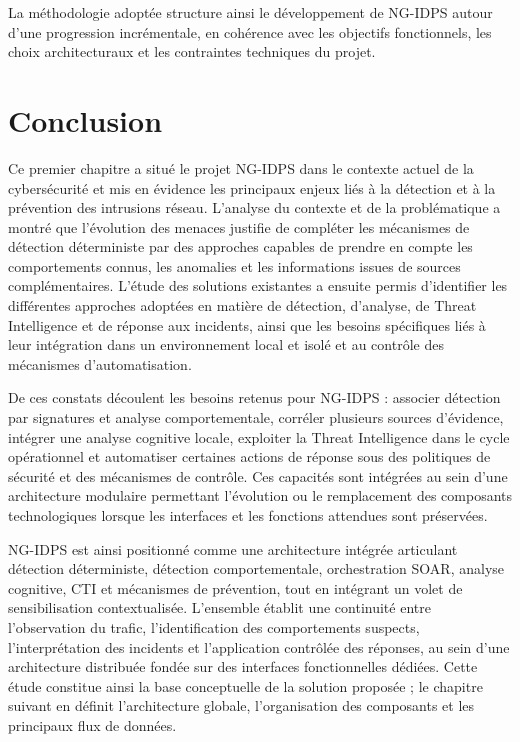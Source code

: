 La méthodologie adoptée structure ainsi le développement de NG-IDPS autour d'une progression incrémentale, en cohérence avec les objectifs fonctionnels, les choix architecturaux et les contraintes techniques du projet.

\section{Conclusion}

Ce premier chapitre a situé le projet NG-IDPS dans le contexte actuel de la cybersécurité et mis en évidence les principaux enjeux liés à la détection et à la prévention des intrusions réseau. L'analyse du contexte et de la problématique a montré que l'évolution des menaces justifie de compléter les mécanismes de détection déterministe par des approches capables de prendre en compte les comportements connus, les anomalies et les informations issues de sources complémentaires. L'étude des solutions existantes a ensuite permis d'identifier les différentes approches adoptées en matière de détection, d'analyse, de Threat Intelligence et de réponse aux incidents, ainsi que les besoins spécifiques liés à leur intégration dans un environnement local et isolé et au contrôle des mécanismes d'automatisation.

De ces constats découlent les besoins retenus pour NG-IDPS : associer détection par signatures et analyse comportementale, corréler plusieurs sources d'évidence, intégrer une analyse cognitive locale, exploiter la Threat Intelligence dans le cycle opérationnel et automatiser certaines actions de réponse sous des politiques de sécurité et des mécanismes de contrôle. Ces capacités sont intégrées au sein d'une architecture modulaire permettant l'évolution ou le remplacement des composants technologiques lorsque les interfaces et les fonctions attendues sont préservées.

NG-IDPS est ainsi positionné comme une architecture intégrée articulant détection déterministe, détection comportementale, orchestration SOAR, analyse cognitive, CTI et mécanismes de prévention, tout en intégrant un volet de sensibilisation contextualisée. L'ensemble établit une continuité entre l'observation du trafic, l'identification des comportements suspects, l'interprétation des incidents et l'application contrôlée des réponses, au sein d'une architecture distribuée fondée sur des interfaces fonctionnelles dédiées. Cette étude constitue ainsi la base conceptuelle de la solution proposée ; le chapitre suivant en définit l'architecture globale, l'organisation des composants et les principaux flux de données.
